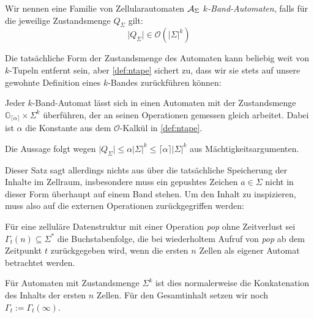 \documentclass{article}
\begin{document}
\newcommand{\ca}{\ensuremath\mathcal{A}}
\newcommand{\abs}[1]{\lvert#1\rvert}
\newcommand{\ceil}[1]{\lceil#1\rceil}
\newcommand{\zrange}[1]{\mathbb{G}_{#1}}

\begin{definition}
    Wir nennen eine Familie von Zellularautomaten $\ca_\Sigma$ \emph{$k$-Band-Automaten}, falls für die jeweilige Zustandsmenge $Q_\Sigma$ gilt:
    \begin{equation}
        \abs{Q_\Sigma} \in \mathcal{O}(\abs{\Sigma}^k) \label{def:ntape}
    \end{equation}
\end{definition}

Die tatsächliche Form der Zustandsmenge des Automaten kann beliebig weit von $k$-Tupeln entfernt sein, aber \eqref{def:ntape} sichert zu, dass wir sie stets auf unsere gewohnte Definition eines $k$-Bandes zurückführen können:

\begin{satz}
    \label{thm:tape-hom}
    Jeder $k$-Band-Automat lässt sich in einen Automaten mit der Zustandsmenge $\zrange{\ceil\alpha} \times \Sigma^k$ überführen, der an seinen Operationen gemessen gleich arbeitet. Dabei ist $\alpha$ die Konstante aus dem $\mathcal{O}$-Kalkül in \eqref{def:ntape}.

    \begin{beweis}
        Die Aussage folgt wegen $\abs{Q_\Sigma} \leq \alpha \abs{\Sigma}^k \leq \ceil\alpha \abs{\Sigma}^k$ aus Mächtigkeitsargumenten.
    \end{beweis}
\end{satz}

Dieser Satz sagt allerdings nichts aus über die tatsächliche Speicherung der Inhalte im Zellraum, insbesondere muss ein gepushtes Zeichen $a \in \Sigma$ nicht in dieser Form überhaupt auf einem Band stehen. Um den Inhalt zu inspizieren, muss also auf die externen Operationen zurückgegriffen werden:

\begin{definition}
    Für eine zelluläre Datenstruktur mit einer Operation \emph{pop} ohne Zeitverlust sei $\Gamma_t(n) \subseteq \Sigma^*$ die Buchstabenfolge, die bei wiederholtem Aufruf von \emph{pop} ab dem Zeitpunkt $t$ zurückgegeben wird, wenn die ersten $n$ Zellen als eigener Automat betrachtet werden.

    Für Automaten mit Zustandsmenge $\Sigma^k$ ist dies normalerweise die Konkatenation des Inhalts der ersten $n$ Zellen.
    Für den Gesamtinhalt setzen wir noch $\Gamma_t := \Gamma_t(\infty)$.
\end{definition}
\end{document}

